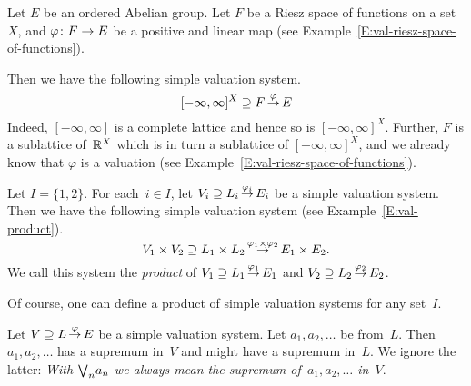 \documentclass[main.tex]{subfiles}
\begin{document}
%
%
\begin{ex}
\label{E:riesz-function-space-simple-system}
Let $E$ be an ordered Abelian group.
Let $F$ be a Riesz space of functions on a set~$X$,
and $\varphi\colon F\rightarrow E$ be a positive and linear map
(see Example~\ref{E:val-riesz-space-of-functions}).

Then we have the following simple valuation system.
\begin{equation*}
[-\infty,\infty]^X \supseteq F\,\smash{\stackrel{\varphi}{\rightarrow}}\,E
\end{equation*}
Indeed, $[-\infty,\infty]$ is a complete lattice
and hence so is $[-\infty,\infty]^X$.
Further, $F$ is a sublattice of~$\mathbb{R}^X$
which is in turn a sublattice of $[-\infty,\infty]^X$,
and we already know that
$\varphi$ is a valuation (see Example~\ref{E:val-riesz-space-of-functions}).
\end{ex}

\begin{ex}
Let $I=\{1,2\}$.
For each~$i\in I$,
let $V_i \supseteq L_i\,\smash{\stackrel{\varphi_i}{\rightarrow}}\,E_i$
be a simple valuation system.
Then we have the following simple valuation system
(see Example~\ref{E:val-product}).
\begin{equation*}
V_1\times V_2 \supseteq L_1 \times L_2\,\smash{\stackrel{\varphi_1 \times \varphi_2}{\rightarrow}}\,E_1 \times E_2.
\end{equation*}
We call this system
the \emph{product} of $V_1 \supseteq L_1\,\smash{\stackrel{\varphi_1}{\rightarrow}}\,E_1$
and $V_2 \supseteq L_2\,\smash{\stackrel{\varphi_2}{\rightarrow}}\,E_2$.

Of course,
one can define a product of simple valuation systems
for any set~$I$.
\end{ex}

%
%
\begin{nt}
Let $V \supseteq L\,\smash{\stackrel{\varphi}{\rightarrow}}\,E$ be a simple valuation system.
Let $a_1, a_2, \dotsc$ be from~$L$.
Then $a_1, a_2,\dotsc$ has a supremum
in~$V$ and might have a supremum in~$L$.
We ignore the latter:
\emph{With $\textstyle{\bigvee}_n a_n$
we always mean the supremum of~$a_1, a_2,\dotsc $ in~$V$}.
\end{nt}
%
%
%
\end{document}
